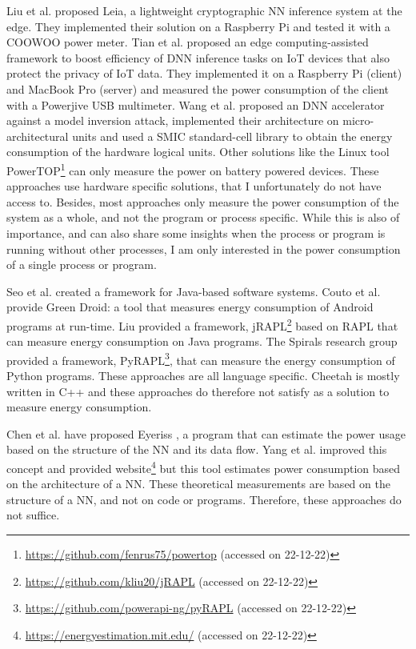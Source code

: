 \documentclass[../thesis.tex]{subfiles}
\begin{document}
Liu et al. \parencite*{liu2022} proposed Leia, a lightweight cryptographic NN inference system at the edge. They implemented their solution on a Raspberry Pi and tested it with a COOWOO power meter. Tian et al. \parencite*{tian2021} proposed an edge computing-assisted framework to boost efficiency of DNN inference tasks on IoT devices that also protect the privacy of IoT data. They implemented it on a Raspberry Pi (client) and MacBook Pro (server) and measured the power consumption of the client with a Powerjive USB multimeter. Wang et al. \parencite*{wang2019} proposed an DNN accelerator against a model inversion attack, implemented their architecture on micro-architectural units and used a SMIC standard-cell library to obtain the energy consumption of the hardware logical units. Other solutions like the Linux tool PowerTOP\footnote{\url{https://github.com/fenrus75/powertop} (accessed on 22-12-22)} can only measure the power on battery powered devices. These approaches use hardware specific solutions, that I unfortunately do not have access to. Besides, most approaches only measure the power consumption of the system as a whole, and not the program or process specific. While this is also of importance, and can also share some insights when the process or program is running without other processes, I am only interested in the power consumption of a single process or program.

Seo et al. \parencite*{seo2008} created a framework for Java-based software systems. Couto et al. \parencite*{couto2015} provide Green Droid: a tool that measures energy consumption of Android programs at run-time. Liu provided a framework, jRAPL\footnote{\url{https://github.com/kliu20/jRAPL} (accessed on 22-12-22)} based on RAPL that can measure energy consumption on Java programs. The Spirals research group provided a framework, PyRAPL\footnote{\url{https://github.com/powerapi-ng/pyRAPL} (accessed on 22-12-22)}, that can measure the energy consumption of Python programs. These approaches are all language specific. Cheetah is mostly written in C++ and these approaches do therefore not satisfy as a solution to measure energy consumption.

Chen et al. have proposed Eyeriss \parencite{chen2016, chen20162}, a program that can estimate the power usage based on the structure of the NN and its data flow. Yang et al. \parencite*{yang2016} improved this concept and provided website\footnote{\url{https://energyestimation.mit.edu/} (accessed on 22-12-22)} but this tool estimates power consumption based on the architecture of a NN. These theoretical measurements are based on the structure of a NN, and not on code or programs. Therefore, these approaches do not suffice.
\end{document}
